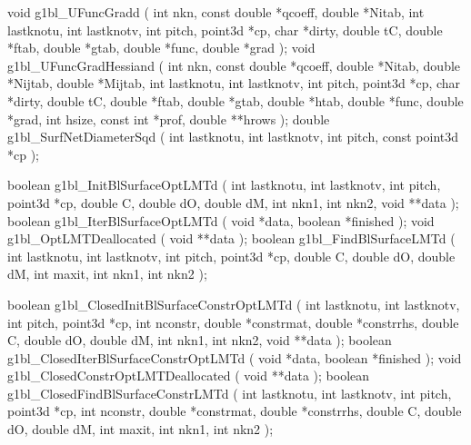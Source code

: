 \begin{listingC}
void g1bl_UFuncGradd ( int nkn, const double *qcoeff, double *Nitab,
                       int lastknotu, int lastknotv,
                       int pitch, point3d *cp, char *dirty,
                       double tC, double *ftab, double *gtab,
                       double *func, double *grad );
void g1bl_UFuncGradHessiand ( int nkn, const double *qcoeff, double *Nitab,
                              double *Nijtab, double *Mijtab,
                              int lastknotu, int lastknotv,  
                              int pitch, point3d *cp, char *dirty,
                              double tC, double *ftab, double *gtab, double
                              *htab,
                              double *func, double *grad,
                              int hsize, const int *prof, double **hrows );
double g1bl_SurfNetDiameterSqd ( int lastknotu, int lastknotv,
                                 int pitch, const point3d *cp );
\end{listingC}

\begin{listingC}
boolean g1bl_InitBlSurfaceOptLMTd ( int lastknotu, int lastknotv, int pitch,
                                    point3d *cp,
                                    double C, double dO, double dM,
                                    int nkn1, int nkn2,
                                    void **data );
boolean g1bl_IterBlSurfaceOptLMTd ( void *data, boolean *finished );
void g1bl_OptLMTDeallocated ( void **data );
boolean g1bl_FindBlSurfaceLMTd ( int lastknotu, int lastknotv, int pitch,
                                 point3d *cp,
                                 double C, double dO, double dM,
                                 int maxit, int nkn1, int nkn2 );
\end{listingC}

\begin{listingC}
boolean g1bl_ClosedInitBlSurfaceConstrOptLMTd (
                   int lastknotu, int lastknotv, int pitch, point3d *cp,
                   int nconstr, double *constrmat, double *constrrhs,   
                   double C, double dO, double dM, int nkn1, int nkn2,  
                   void **data );
boolean g1bl_ClosedIterBlSurfaceConstrOptLMTd ( void *data, boolean *finished );
void g1bl_ClosedConstrOptLMTDeallocated ( void **data );
boolean g1bl_ClosedFindBlSurfaceConstrLMTd (
                   int lastknotu, int lastknotv, int pitch, point3d *cp,
                   int nconstr, double *constrmat, double *constrrhs,   
                   double C, double dO, double dM,
                   int maxit, int nkn1, int nkn2 );
\end{listingC}

